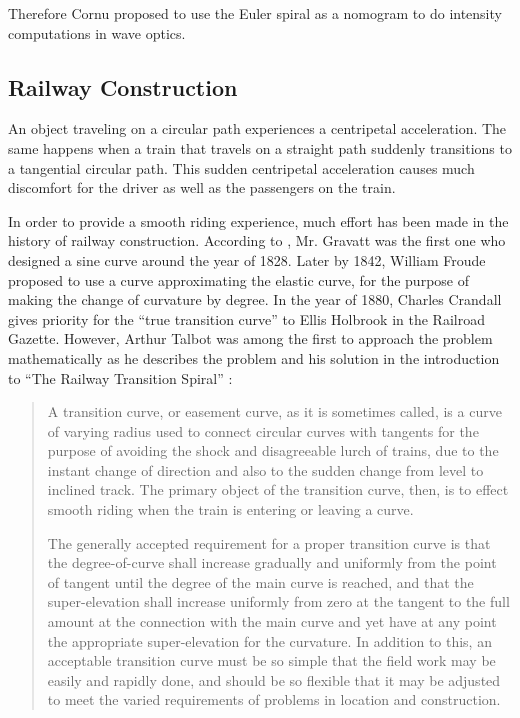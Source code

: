 \documentclass[12pt]{article}
\begin{document}
Therefore Cornu proposed to use the Euler spiral as a nomogram to do intensity computations in wave optics.

\FloatBarrier 
\subsection{Railway  Construction}

An object traveling on a circular path experiences a centripetal acceleration. The same happens when a train that travels on a straight path suddenly transitions to a tangential circular path. This sudden centripetal acceleration causes much discomfort for the driver as well as the passengers on the train. 

In order to provide a smooth riding experience, much effort has been made in the history of railway construction. According to \cite{Lev08}, Mr. Gravatt was the first one who designed a sine curve around the year of 1828. Later by 1842, William Froude proposed to use a curve approximating the elastic curve, for the purpose of making the change of curvature by degree. In the year of 1880, Charles Crandall gives priority for the ``true transition curve'' to Ellis Holbrook in the Railroad Gazette. However, Arthur Talbot was among the first to approach the problem mathematically as he describes the problem and his solution in the introduction to ``The Railway Transition Spiral'' \cite{Tal99}:

\begin{quotation}
	A transition curve, or easement curve, as it is sometimes called, is a curve of varying radius
	used to connect circular curves with tangents for the purpose of avoiding the shock and
	disagreeable lurch of trains, due to the instant change of direction and also to the sudden
	change from level to inclined track. The primary object of the transition curve, then, is to
	effect smooth riding when the train is entering or leaving a curve.
	
	The generally accepted requirement for a proper transition curve is that the degree-of-curve
	shall increase gradually and uniformly from the point of tangent until the degree of the main
	curve is reached, and that the super-elevation shall increase uniformly from zero at the
	tangent to the full amount at the connection with the main curve and yet have at any point
	the appropriate super-elevation for the curvature. In addition to this, an acceptable transition
	curve must be so simple that the field work may be easily and rapidly done, and should be so
	flexible that it may be adjusted to meet the varied requirements of problems in location and
	construction.
\end{quotation}
\end{document}
